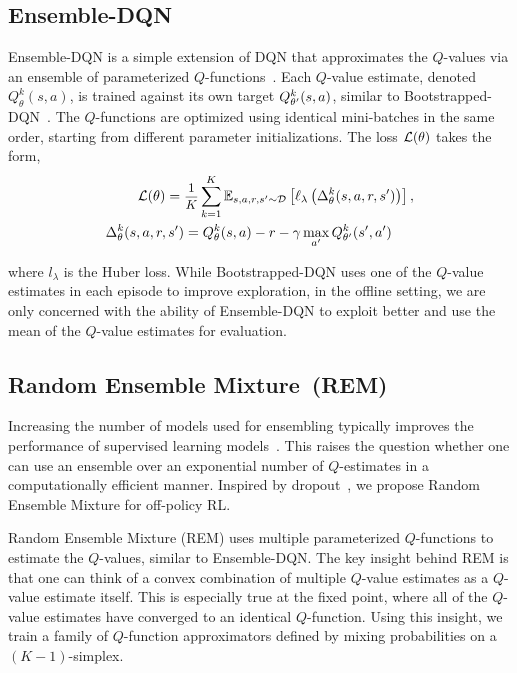 \subsection{Ensemble-DQN}
Ensemble-DQN is a simple extension of DQN that approximates the
$Q$-values via an ensemble of parameterized $Q$-functions~\citep{fausser2015neural,
osband2016deep, anschel2017averaged}.
Each $Q$-value estimate,
denoted $Q_{\theta}^{k}(s, a)$, is trained against its own target
$Q_{\theta^{\prime}}^{k}(s, a)$, similar to Bootstrapped-DQN~\citep{osband2016deep}.
The $Q$-functions
are optimized using identical mini-batches in the same order, starting from
different parameter initializations. The loss $\mathcal{L}(\theta)$ takes the form,
\begin{align}\label{ensemble_eq}
\calL(\mathrm{\theta}) ={}& \sfrac{1}{K} \sum_{k=1}^{K} \expected_{s, a, r, s' \sim \setD} \left[ \ld\left(\Delta^{k}_\theta(s, a, r, s') \right)\right],\\
\Delta^{k}_\theta(s, a, r, s') &= \Qt^{k}(s, a) - r - \gamma\max_{a'} \Qtp^{k}(s', a') \nonumber
\end{align}

where $l_{\lambda }$ is the Huber loss. While Bootstrapped-DQN uses one
of the $Q$-value estimates in each episode to improve exploration, in
the offline setting, we are only concerned with the ability of
Ensemble-DQN to exploit better and use the mean of the $Q$-value estimates for evaluation.

\subsection{Random Ensemble Mixture~(REM)}\label{sec:rem}

Increasing the number of models used for ensembling typically improves
the performance of supervised learning
models~\citep{shazeer2017outrageously}.  This raises the question
whether one can use an ensemble over an exponential number of
$Q$-estimates in a computationally efficient manner. Inspired by
dropout~\citep{srivastava2014dropout}, we propose Random Ensemble
Mixture for off-policy RL.

Random Ensemble Mixture (REM) uses multiple parameterized
$Q$-functions to estimate the $Q$-values, similar to Ensemble-DQN.
The key insight behind REM is that one can think of a convex
combination of multiple $Q$-value estimates as a $Q$-value
estimate itself. This is especially true at the fixed point, where all
of the $Q$-value estimates have converged to an identical
$Q$-function. Using this insight, we train a family of $Q$-function
approximators defined by mixing probabilities on a $(K-1)$-simplex.

